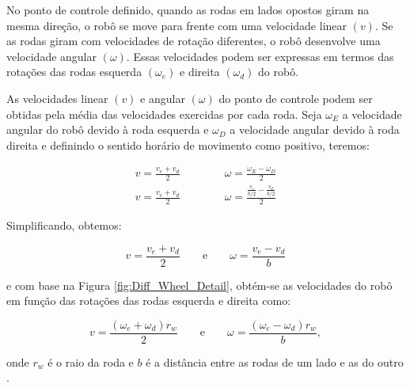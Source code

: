     No ponto de controle definido, quando as rodas em lados opostos giram na mesma direção, o robô se move para frente com uma velocidade linear $(v)$. Se as rodas giram com velocidades de rotação diferentes, o robô desenvolve uma velocidade angular $(\omega)$. Essas velocidades podem ser expressas em termos das rotações das rodas esquerda $(\omega_e)$ e direita $(\omega_d)$ do robô.
    
    As velocidades linear $(v)$ e angular $(\omega)$  do ponto de controle podem ser obtidas pela média das velocidades exercidas por cada roda. Seja $\omega_E$ a velocidade angular do robô devido à roda esquerda e $\omega_D$ a velocidade angular devido à roda direita e definindo o sentido horário de movimento como positivo, teremos:

    \begin{eqnarray}
        v = \frac{v_e + v_d}{2} \qquad  \qquad \omega = \frac{\omega_E - \omega_D}{2}   \\
        v = \frac{v_e + v_d}{2} \qquad  \qquad \omega = \frac{\frac{v_e}{b/2} - \frac{v_d}{b/2}}{2}
    \end{eqnarray}
    
    

    Simplificando, obtemos:

    \begin{equation}
        v = \frac{v_e + v_d}{2} \qquad \text{e} \qquad \omega = \frac{v_e-v_d}{b}
    \end{equation}
    
    e com base na Figura \ref{fig:Diff_Wheel_Detail}, obtém-se as velocidades do robô em função das rotações das rodas esquerda e direita como:
    
    \begin{equation} 
    v = \frac{(\omega_e + \omega_d)r_w}{2} \qquad \text{e} \qquad \omega = \frac{(\omega_e - \omega_d)r_w}{b}, 
    \end{equation} 
    
    onde $r_w$ é o raio da roda e $b$ é a distância entre as rodas de um lado e as do outro \cite{Bouzoualegh2018ModelRobot} \cite{book:siegwart2011} \cite{Sarcinelli-Filho2023KinematicModels}.

